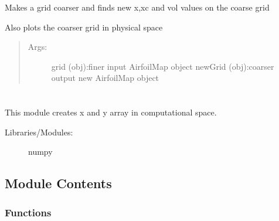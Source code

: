 \documentclass[letterpaper,10pt,english]{sphinxmanual}
\begin{document}

\begin{fulllineitems}
\label{\detokenize{autoapi/airfoil_map/index:airfoil_map.init_from_grid}}
\sphinxAtStartPar
Makes a grid coarser and finds new x,xc and vol values on the coarse grid

\sphinxAtStartPar
Also plots the coarser grid in physical space
\begin{quote}
\begin{description}
\item[{Args:}] \leavevmode
\sphinxAtStartPar
grid (obj):finer input AirfoilMap object
newGrid (obj):coarser output new AirfoilMap object

\end{description}
\end{quote}

\end{fulllineitems}



\section{}
\label{\detokenize{autoapi/coord_strch_func/index:module-coord_strch_func}}\label{\detokenize{autoapi/coord_strch_func/index:coord-strch-func}}\label{\detokenize{autoapi/coord_strch_func/index::doc}}
\sphinxAtStartPar
This module creates x and y array in computational space.
\begin{description}
\item[{Libraries/Modules:}] \leavevmode
\sphinxAtStartPar
numpy

\end{description}


\subsection{Module Contents}
\label{\detokenize{autoapi/coord_strch_func/index:module-contents}}

\subsubsection{Functions}
\label{\detokenize{autoapi/coord_strch_func/index:functions}}
\end{document}
